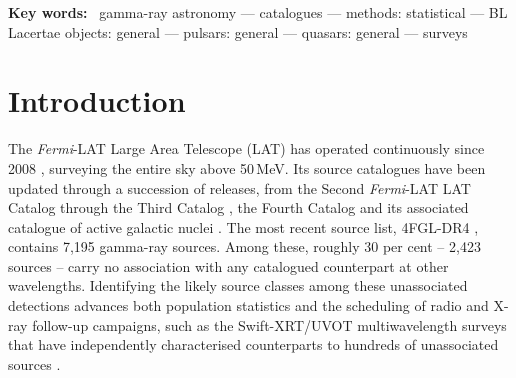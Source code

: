 \documentclass[fleqn,12pt]{article}
\newcommand{\fermi}{\textit{Fermi}-LAT}
\newcommand{\fgl}{4FGL-DR4}
\begin{document}
\begin{abstract}
out-of-distribution (OOD); their classifications carry reduced
reliability and are clearly flagged in our published table. An
out-of-fold calibration check shows that our adopted high-confidence
threshold, $P_{\rm max} \geq 0.80$, corresponds to an observed accuracy
of 96.1\,\% among in-distribution sources, validating its use for
follow-up prioritisation. Applying the 10-feature Random Forest
(retrained deterministically; see Data Availability) to the
1,598 remaining in-distribution sources, we identify 541 high-confidence
candidates ($P_{\rm max} \geq 0.80$): 274 BLL, 61 FSRQ, 74 PSR, and
132 MSP. All posterior probability tables, the trained model, and the
analysis and validation code are provided as supplementary
machine-readable data.
\end{abstract}

\noindent\textbf{Key words:}~
gamma-ray astronomy --- catalogues --- methods: statistical ---
BL Lacertae objects: general --- pulsars: general ---
quasars: general --- surveys
\\[6pt]

\section{Introduction}
\label{sec:intro}

The \fermi{} Large Area Telescope (LAT) has operated continuously since
2008 \citep{Atwood2009}, surveying the entire sky above 50\,MeV. Its
source catalogues have been updated through a succession of releases,
from the Second \fermi{} LAT Catalog \citep{Nolan2012} through the
Third Catalog \citep{Acero2015_3FGL}, the Fourth Catalog
\citep{Abdollahi2020} and its associated catalogue of
active galactic nuclei \citep{Ackermann2015_3LAC,Ajello2020}. The most
recent source list, \fgl{} \citep{Ballet2023}, contains 7,195
gamma-ray sources. Among
these, roughly 30 per cent -- 2,423 sources -- carry no association
with any catalogued counterpart at other wavelengths.
Identifying the likely source classes among these unassociated
detections advances both population statistics and the scheduling of
radio and X-ray follow-up campaigns, such as the Swift-XRT/UVOT
multiwavelength surveys that have independently characterised
counterparts to hundreds of unassociated sources \citep{Kerby2021}.
\end{document}
